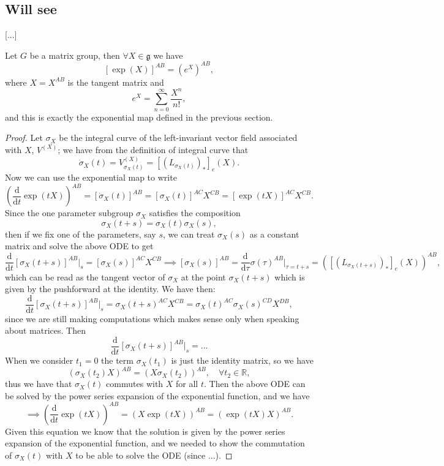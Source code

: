 \subsection{Will see}

[...]

\begin{proposition}
    Let $G$ be a matrix group, then \(\forall X \in \mathfrak{g}\) we have
    \[
        [\exp(X)]^{AB} = (e^X)^{AB},
    \]
    where \(X=X^{AB}\) is the tangent matrix and
    \[
        e^X = \sum_{n=0}^\infty \frac{X^n}{n!},
    \]
    and this is exactly the exponential map defined in the previous section.
\end{proposition}

\begin{proof}
    Let \(\sigma_{X}\) be the integral curve of the left-invariant vector field associated with \(X\), \(V^{(X)}\); we have from the definition of integral curve that
    \[
        \dot{\sigma}_{X}(t) = V^{(X)}_{\sigma_{X}(t)} = [(L_{\sigma_{X}(t)})_{*}]_e (X).
    \]
    Now we can use the exponential map to write
    \[
        (\frac{\mathrm{d} }{\mathrm{d} t} \exp(tX))^{AB} = [\dot{\sigma}_{X}(t)]^{AB} = [\sigma_{X}(t)]^{AC} X^{CB} = [\exp(tX)]^{AC} X^{CB}.
    \]
    Since the one parameter subgroup \(\sigma_{X}\) satisfies the composition
    \[
        \sigma_{X}(t+s) = \sigma_{X}(t) \sigma_{X}(s),
    \]
    then if we fix one of the parameters, say \(s\), we can treat \(\sigma_{X}(s)\) as a constant matrix and solve the above ODE to get
    \[
        \frac{\mathrm{d}}{\mathrm{d} t} [\sigma_{X}(t+s)]^{AB}\bigg|_{s} = [\sigma_{X}(s)]^{AC} X^{CB} \implies [\sigma_{X}(s)]^{AB} = \frac{\mathrm{d} }{\mathrm{d} \tau} \sigma(\tau)^{AB} \bigg|_{\tau=t+s} = \left( [(L_{\sigma_{X}(t+s)})_*]_e (X) \right)^{AB},
    \]
    which can be read as the tangent vector of \(\sigma_{X}\) at the point \(\sigma_{X}(t+s)\) which is given by the pushforward at the identity. We have then:
    \[
        \frac{\mathrm{d}}{\mathrm{d} t} [\sigma_{X}(t+s)]^{AB}\bigg|_{s} = \sigma_X(t+s)^{AC} X^{CB} = \sigma_X(t)^{AC} \sigma_X(s)^{CD} X^{DB},
    \]
    since we are still making computations which makes sense only when speaking about matrices. Then
    \[
        \frac{\mathrm{d}}{\mathrm{d} t} [\sigma_{X}(t+s)]^{AB}\bigg|_{s} = \dots
    \]
    When we consider \(t_1 = 0\) the term \(\sigma_{X}(t_1)\) is just the identity matrix, so we have
    \[
        (\sigma_X(t_2) X)^{AB} = (X \sigma_X(t_2))^{AB}, \quad \forall t_2 \in \mathbb{R},
    \]
    thus we have that \(\sigma_X(t)\) commutes with \(X\) for all \(t\). Then the above ODE can be solved by the power series expansion of the exponential function, and we have
    \[
        \implies (\frac{\mathrm{d} }{\mathrm{d} t} \exp(tX))^{AB} = (X \exp(tX))^{AB} = (\exp(tX) X)^{AB}.
    \]
    Given this equation we know that the solution is given by the power series expansion of the exponential function, and we needed to show the commutation of \(\sigma_X(t)\) with \(X\) to be able to solve the ODE (since ...).
\end{proof}

